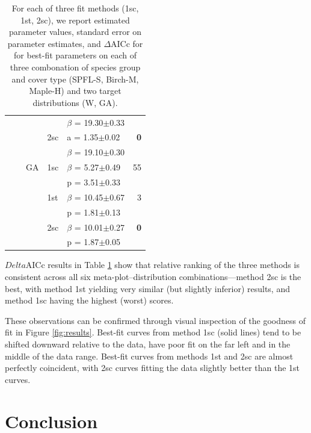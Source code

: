 \documentclass{article}
\begin{document}
\begin{table}[h!]
{\begin{tabular}{lllllr}
 &  &  &  & $\beta$ = 19.30$\pm$0.33 &  \\
 &  &  & 2sc & a = 1.35$\pm$0.02 & \textbf{0} \\
 &  &  &  & $\beta$ = 19.10$\pm$0.30 & \textbf{} \\
 &  & GA & 1sc & $\beta$ = 5.27$\pm$0.49 & 55 \\
 &  &  &  & p = 3.51$\pm$0.33 &  \\
 &  &  & 1st & $\beta$ = 10.45$\pm$0.67 & 3 \\
 &  &  &  & p = 1.81$\pm$0.13 &  \\
 &  &  & 2sc & $\beta$ = 10.01$\pm$0.27 & \textbf{0} \\
 &  &  &  & p = 1.87$\pm$0.05 & \textbf{} \\
  
  \bottomrule
  \end{tabular}
}
  
\caption{For each of three fit methods (1sc, 1st, 2sc), we report estimated parameter values, standard error on parameter estimates, and $\Delta$AICc for for best-fit parameters on each of three combonation of species group and cover type (SPFL-S, Birch-M, Maple-H) and two target distributions (W, GA).}
\label{tab:results}
\end{table}

$Delta$AICc results in Table \ref{tab:results} show that relative ranking of the three methods is consistent across all six meta-plot--distribution combinations---method 2sc is the best, with method 1st yielding very similar (but slightly inferior) results, and method 1sc having the highest (worst) scores.

These observations can be confirmed through visual inspection of the goodness of fit in Figure \ref{fig:results}.
Best-fit curves from method 1sc (solid lines) tend to be shifted downward relative to the data, have poor fit on the far left and in the middle of the data range.
Best-fit curves from methods 1st and 2sc are almost perfectly coincident, with 2sc curves fitting the data slightly better than the 1st curves.
 
  

  \section{Conclusion}
  \label{sec:conclusion}
\end{document}
